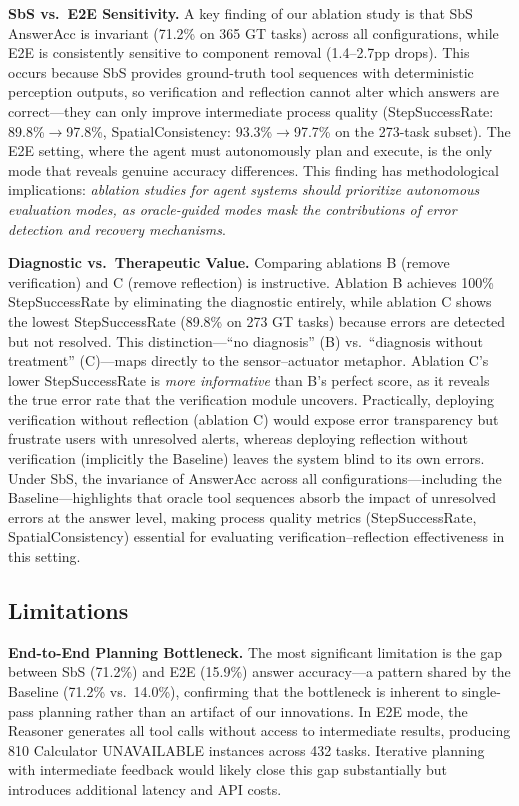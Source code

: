 \documentclass[journal]{IEEEtran}
\begin{document}
\textbf{SbS vs.\ E2E Sensitivity.}
A key finding of our ablation study is that SbS AnswerAcc is invariant (71.2\% on 365 GT tasks) across all configurations, while E2E is consistently sensitive to component removal (1.4--2.7pp drops).
This occurs because SbS provides ground-truth tool sequences with deterministic perception outputs, so verification and reflection cannot alter which answers are correct---they can only improve intermediate process quality (StepSuccessRate: 89.8\%$\rightarrow$97.8\%, SpatialConsistency: 93.3\%$\rightarrow$97.7\% on the 273-task subset).
The E2E setting, where the agent must autonomously plan and execute, is the only mode that reveals genuine accuracy differences.
This finding has methodological implications: \emph{ablation studies for agent systems should prioritize autonomous evaluation modes, as oracle-guided modes mask the contributions of error detection and recovery mechanisms}.

\textbf{Diagnostic vs.\ Therapeutic Value.}
Comparing ablations B (remove verification) and C (remove reflection) is instructive.
Ablation B achieves 100\% StepSuccessRate by eliminating the diagnostic entirely, while ablation C shows the lowest StepSuccessRate (89.8\% on 273 GT tasks) because errors are detected but not resolved.
This distinction---``no diagnosis'' (B) vs.\ ``diagnosis without treatment'' (C)---maps directly to the sensor--actuator metaphor.
Ablation C's lower StepSuccessRate is \emph{more informative} than B's perfect score, as it reveals the true error rate that the verification module uncovers.
Practically, deploying verification without reflection (ablation C) would expose error transparency but frustrate users with unresolved alerts, whereas deploying reflection without verification (implicitly the Baseline) leaves the system blind to its own errors.
Under SbS, the invariance of AnswerAcc across all configurations---including the Baseline---highlights that oracle tool sequences absorb the impact of unresolved errors at the answer level, making process quality metrics (StepSuccessRate, SpatialConsistency) essential for evaluating verification--reflection effectiveness in this setting.

\subsection{Limitations}

\textbf{End-to-End Planning Bottleneck.}
The most significant limitation is the gap between SbS (71.2\%) and E2E (15.9\%) answer accuracy---a pattern shared by the Baseline (71.2\% vs.\ 14.0\%), confirming that the bottleneck is inherent to single-pass planning rather than an artifact of our innovations.
In E2E mode, the Reasoner generates all tool calls without access to intermediate results, producing 810 Calculator UNAVAILABLE instances across 432 tasks.
Iterative planning with intermediate feedback would likely close this gap substantially but introduces additional latency and API costs.
\end{document}
